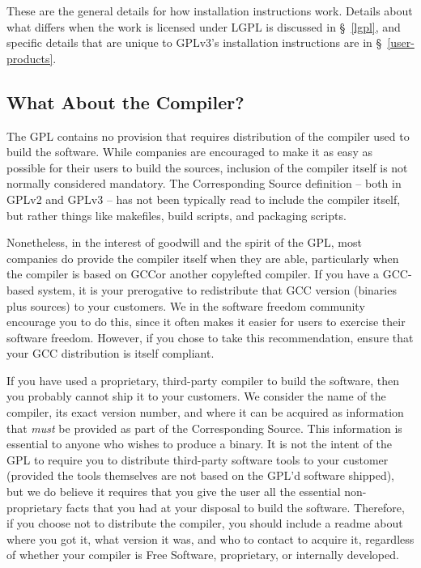 These are the general details for how installation instructions work.
Details about what differs when the work is licensed under LGPL is
discussed in \S~\ref{lgpl}, and specific details that are unique to
GPLv3's installation instructions are in \S~\ref{user-products}.

\subsection{What About the Compiler?}

The GPL contains no provision that requires distribution of the compiler
used to build the software.  While companies are encouraged to make it as
easy as possible for their users to build the sources, inclusion of the
compiler itself is not normally considered mandatory.  The Corresponding
Source definition -- both in GPLv2 and GPLv3 -- has not been typically
read to include the compiler itself, but rather things like makefiles,
build scripts, and packaging scripts.

Nonetheless, in the interest of goodwill and the spirit of the GPL, most
companies do provide the compiler itself when they are able, particularly
when the compiler is based on GCC\@ or another copylefted compiler.  If you have
a GCC-based system, it is your prerogative to redistribute that GCC
version (binaries plus sources) to your customers.  We in the software freedom
community encourage you to do this, since it often makes it easier for
users to exercise their software freedom.  However, if you chose to take
this recommendation, ensure that your GCC distribution is itself
compliant.

If you have used a proprietary, third-party compiler to build the
software, then you probably cannot ship it to your customers.  We consider
the name of the compiler, its exact version number, and where it can be
acquired as information that \emph{must} be provided as part of the
Corresponding Source.  This information is essential to anyone who wishes
to produce a binary.  It is not the intent of the GPL to require you to
distribute third-party software tools to your customer (provided the tools
themselves are not based on the GPL'd software shipped), but we do believe
it requires that you give the user all the essential non-proprietary facts
that you had at your disposal to build the software.  Therefore, if you
choose not to distribute the compiler, you should include a {\sc readme}
about where you got it, what version it was, and who to contact to acquire
it, regardless of whether your compiler is Free Software, proprietary, or
internally developed.

